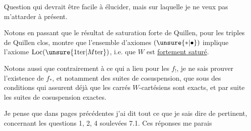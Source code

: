 Question qui devrait être facile à élucider, mais sur laquelle je ne veux pas m'attarder à présent.

Notons en passant que le résultat de saturation forte de Quillen, pour les triples de Quillen clos, montre que l'ensemble d'axiomes $(\unsure{*|\bullet})$ implique  l'axiome $\mathrm{Loc}(\unsure{1\mathrm{ter}|M\mathrm{ter}})$, i.e. que $W$ est \uline{fortement saturé}.

Notons aussi que contrairement à ce qui a lieu pour les $f_!$, je ne sais prouver l'existence de $f_*$, et notamment des suites de cosuspension, que sous des conditions  qui assurent déjà que les carrés $W$-cartésiens sont exacts, et par suite les suites de cosuspension exactes.

Je pense que dans  pages précédentes j'ai dit tout ce que je sais dire de pertinent, concernant les questions 1, 2, 4 soulevées  7.1. Ces réponses me parais%

